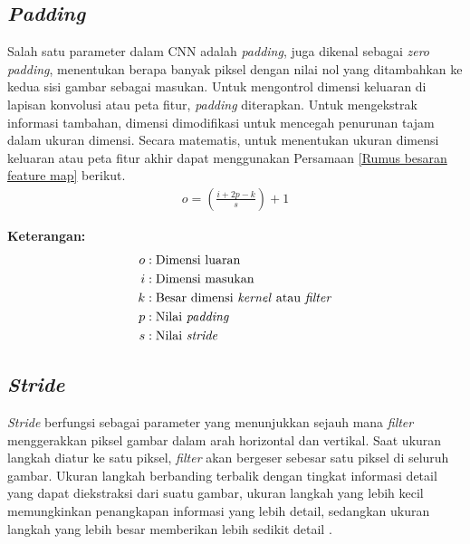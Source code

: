  \subsection{\textit{Padding}}


    Salah satu parameter dalam CNN adalah \textit{padding}, juga dikenal sebagai \textit{zero padding}, menentukan berapa banyak piksel dengan nilai nol yang ditambahkan ke kedua sisi gambar sebagai masukan. Untuk mengontrol dimensi keluaran di lapisan konvolusi atau peta fitur, \textit{padding} diterapkan. Untuk mengekstrak informasi tambahan, dimensi dimodifikasi untuk mencegah penurunan tajam dalam ukuran dimensi. Secara matematis, untuk menentukan ukuran dimensi keluaran atau peta fitur akhir dapat menggunakan Persamaan \ref{Rumus besaran feature map} \cite{hakim2018implementasi} berikut.
    \begin{equation}
        \begin{aligned}
          o = \left( \frac{i + 2p - k}{s} \right) + 1
      \end{aligned}\label{Rumus besaran feature map}
    \end{equation}



    \textbf{Keterangan:}
        \begin{align*}
        o & : \text{Dimensi luaran} \\
        i & : \text{Dimensi masukan} \\
        k & : \text{Besar dimensi \textit{kernel} atau \textit{filter}} \\
        p & : \text{Nilai \textit{padding}} \\
        s & : \text{Nilai \textit{stride}}
        \end{align*}
        


\subsection{\textit{Stride}}

    \textit{Stride} berfungsi sebagai parameter yang menunjukkan sejauh mana \textit{filter} menggerakkan piksel gambar dalam arah horizontal dan vertikal. Saat ukuran langkah diatur ke satu piksel, \textit{filter} akan bergeser sebesar satu piksel di seluruh gambar. Ukuran langkah berbanding terbalik dengan tingkat informasi detail yang dapat diekstraksi dari suatu gambar, ukuran langkah yang lebih kecil memungkinkan penangkapan informasi yang lebih detail, sedangkan ukuran langkah yang lebih besar memberikan lebih sedikit detail \cite{Dewi2018}.

